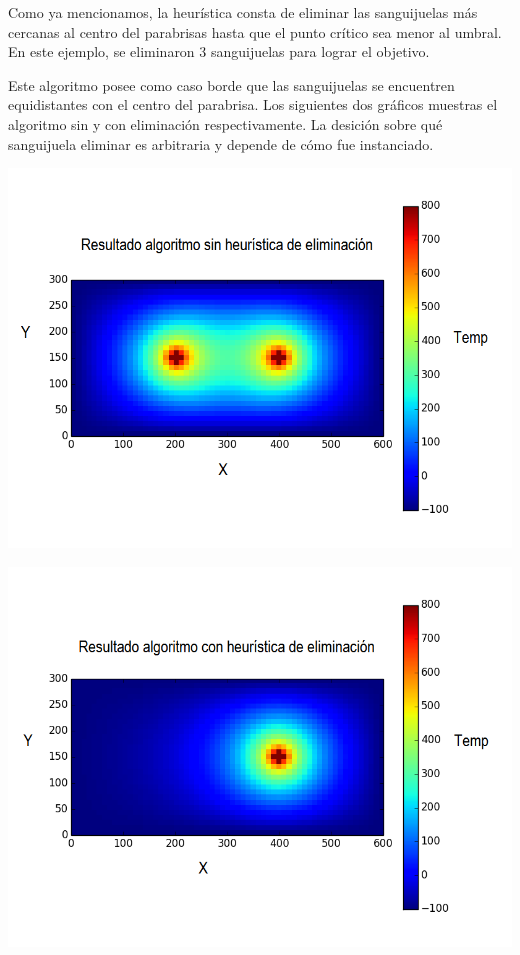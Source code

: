 	Como ya mencionamos, la heurística consta de eliminar las sanguijuelas más cercanas al centro del parabrisas hasta que el punto crítico sea menor al umbral. En este ejemplo, se eliminaron 3 sanguijuelas para lograr el objetivo.

	Este algoritmo posee como caso borde que las sanguijuelas se encuentren equidistantes con el centro del parabrisa. Los siguientes dos gráficos muestras el algoritmo sin y con eliminación respectivamente. La desición sobre qué sanguijuela eliminar es arbitraria y depende de cómo fue instanciado.

	\begin{center}
		\includegraphics[width=\textwidth]{./img/test6_sinkill.png}
	\end{center}

	\begin{center}
		\includegraphics[width=\textwidth]{./img/test6_conkill.png}
	\end{center}

